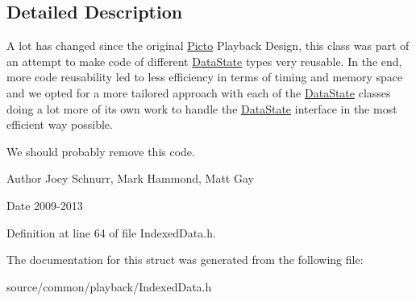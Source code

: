 \subsection{Detailed Description}
A lot has changed since the original \hyperlink{namespace_picto}{Picto} Playback Design, this class was part of an attempt to make code of different \hyperlink{class_picto_1_1_data_state}{Data\-State} types very reusable. In the end, more code reusability led to less efficiency in terms of timing and memory space and we opted for a more tailored approach with each of the \hyperlink{class_picto_1_1_data_state}{Data\-State} classes doing a lot more of its own work to handle the \hyperlink{class_picto_1_1_data_state}{Data\-State} interface in the most efficient way possible. 

We should probably remove this code. \begin{DoxyAuthor}{Author}
Joey Schnurr, Mark Hammond, Matt Gay 
\end{DoxyAuthor}
\begin{DoxyDate}{Date}
2009-\/2013 
\end{DoxyDate}


Definition at line 64 of file Indexed\-Data.\-h.



The documentation for this struct was generated from the following file\-:\begin{DoxyCompactItemize}
\item 
source/common/playback/Indexed\-Data.\-h\end{DoxyCompactItemize}

